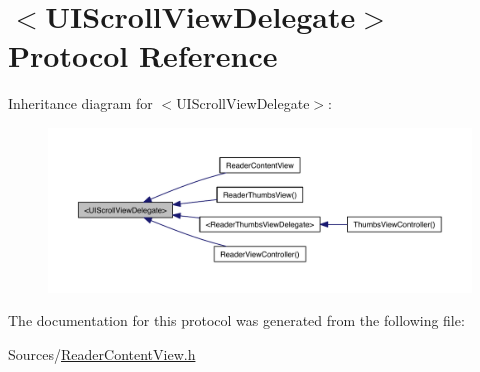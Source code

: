 \hypertarget{class_u_i_scroll_view_delegate-p}{\section{$<$U\-I\-Scroll\-View\-Delegate$>$ Protocol Reference}
\label{d6/dde/class_u_i_scroll_view_delegate-p}
}


Inheritance diagram for $<$U\-I\-Scroll\-View\-Delegate$>$\-:
\nopagebreak
\begin{figure}[H]
\begin{center}
\leavevmode
\includegraphics[width=350pt]{d9/d89/class_u_i_scroll_view_delegate-p__inherit__graph}
\end{center}
\end{figure}


The documentation for this protocol was generated from the following file\-:\begin{DoxyCompactItemize}
\item 
Sources/\hyperlink{_reader_content_view_8h}{Reader\-Content\-View.\-h}\end{DoxyCompactItemize}
